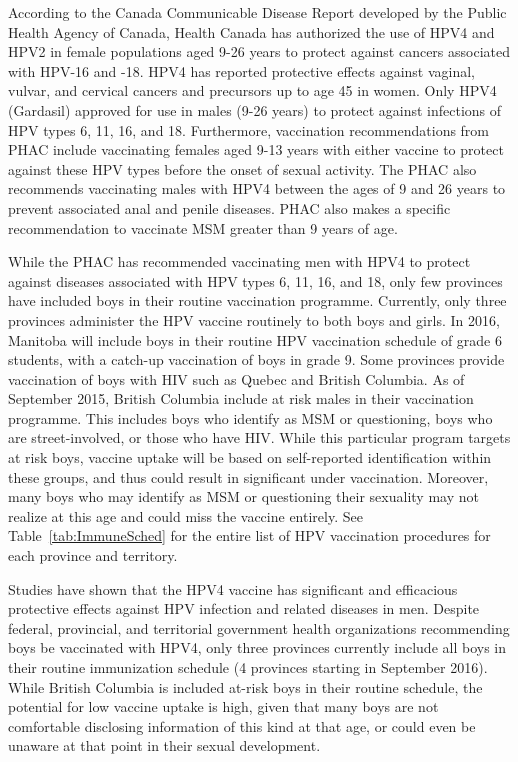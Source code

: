 \documentclass[12pt]{article}
\begin{document}
According to the Canada Communicable Disease Report developed by the Public Health Agency of Canada, Health Canada has authorized the use of HPV4 and HPV2 in female populations aged 9-26 years to protect against cancers associated with HPV-16 and -18.  HPV4 has reported protective effects against vaginal, vulvar, and cervical cancers and precursors up to age 45 in women.  Only HPV4 (Gardasil) approved for use in males (9-26 years) to protect against infections of HPV types 6, 11, 16, and 18.  Furthermore, vaccination recommendations from PHAC include vaccinating females aged 9-13 years  with either vaccine to protect against these HPV types before the onset of sexual activity.  The PHAC also recommends vaccinating males with HPV4 between the ages of 9 and 26 years to prevent associated anal and penile diseases.  PHAC also makes a specific recommendation to vaccinate MSM greater than 9 years of age.  

While the PHAC has recommended vaccinating men with HPV4 to protect against diseases associated with HPV types 6, 11, 16, and 18, only few provinces have included boys in their routine vaccination programme.  Currently, only three provinces administer the HPV vaccine routinely to both boys and girls.  In 2016, Manitoba will include boys in their routine HPV vaccination schedule of grade 6 students, with a catch-up vaccination of boys in grade 9.  Some provinces provide vaccination of boys with HIV such as Quebec and British Columbia.  As of September 2015, British Columbia include at risk males in their vaccination programme.  This includes boys who identify as MSM or questioning, boys who are street-involved, or those who have HIV. While this particular program targets at risk boys, vaccine uptake will be based on self-reported identification within these groups, and thus could result in significant under vaccination.  Moreover, many boys who may identify as MSM or questioning their sexuality may not realize at this age and could miss the vaccine entirely.  See Table~\ref{tab:ImmuneSched} for the entire list of HPV vaccination procedures for each province and territory.  

Studies have shown that the HPV4 vaccine has significant and efficacious protective effects against HPV infection and related diseases in men.  Despite federal, provincial, and territorial government health organizations recommending boys be vaccinated with HPV4, only three provinces currently include all boys in their routine immunization schedule (4 provinces starting in September 2016).  While British Columbia is included at-risk boys in their routine schedule, the potential for low vaccine uptake is high, given that many boys are not comfortable disclosing information of this kind at that age, or could even be unaware at that point in their sexual development.  
\end{document}
